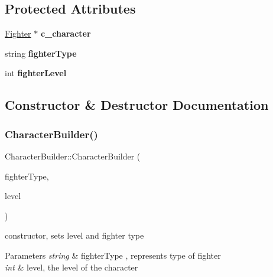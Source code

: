 \subsection*{Protected Attributes}
\begin{DoxyCompactItemize}
\item 
\hypertarget{class_character_builder_a292b9ccbc5b5ccc814ab9cf6a52bdc1b}{}\label{class_character_builder_a292b9ccbc5b5ccc814ab9cf6a52bdc1b} 
\hyperlink{class_fighter}{Fighter} $\ast$ {\bfseries c\+\_\+character}
\item 
\hypertarget{class_character_builder_a71b9ade634fce07f4f9cd6bbcba3dafb}{}\label{class_character_builder_a71b9ade634fce07f4f9cd6bbcba3dafb} 
string {\bfseries fighter\+Type}
\item 
\hypertarget{class_character_builder_acd142b429a5a861ac92a808e630622e1}{}\label{class_character_builder_acd142b429a5a861ac92a808e630622e1} 
int {\bfseries fighter\+Level}
\end{DoxyCompactItemize}


\subsection{Constructor \& Destructor Documentation}
\hypertarget{class_character_builder_ae4e05926be89b82015e95ef98b68aa6e}{}\label{class_character_builder_ae4e05926be89b82015e95ef98b68aa6e} 
\subsubsection{\texorpdfstring{Character\+Builder()}{CharacterBuilder()}}
{\footnotesize\ttfamily Character\+Builder\+::\+Character\+Builder (\begin{DoxyParamCaption}\item[{string}]{fighter\+Type,  }\item[{int}]{level }\end{DoxyParamCaption})}

constructor, sets level and fighter type 
\begin{DoxyParams}{Parameters}
{\em string} & fighter\+Type , represents type of fighter \\
\hline
{\em int} & level, the level of the character \\
\hline
\end{DoxyParams}


